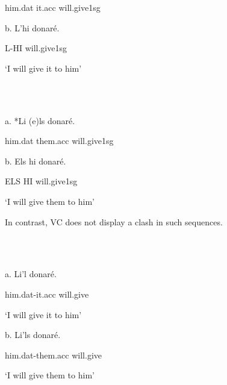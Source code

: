\documentclass[output=paper,modfonts,nonflat]{langsci/langscibook}
\begin{document}
          him.dat    it.acc    will.give1sg

   b. L’hi     donaré.

       L-HI    will.give1sg

  ‘I will give it to him’

\ea%
    \label{ex:key:14}
    \gll\\
        \\
    \glt
    \z

         a. *Li    (e)ls     donaré.

        him.dat    them.acc  will.give1sg

   b. Els hi  donaré.

      ELS HI  will.give1sg

  ‘I will give them to him’

In contrast, VC does not display a clash in such sequences.

\ea%
    \label{ex:key:15}
    \gll\\
        \\
    \glt
    \z

         a. Li’l     donaré. 

       him.dat-it.acc  will.give

  ‘I will give it to him’

  b. Li’ls    donaré.

      him.dat-them.acc  will.give

  ‘I will give them to him’
\end{document}
